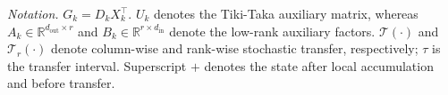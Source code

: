 \documentclass[AMA,LATO2COL]{WileyNJDv5}
\begin{document}
\begin{table}[!t]
{  \vspace{0.25em}
  \begin{minipage}{0.98\textwidth}
  \emph{Notation.}
  \(G_k=D_kX_k^\top\). \(U_k\) denotes the Tiki-Taka auxiliary matrix, whereas
\(A_k\in\mathbb{R}^{d_{\mathrm{out}}\times r}\) and
\(B_k\in\mathbb{R}^{r\times d_{\mathrm{in}}}\) denote the low-rank auxiliary factors.
\(\mathcal{T}(\cdot)\) and \(\mathcal{T}_r(\cdot)\) denote column-wise and rank-wise stochastic transfer, respectively; \(\tau\) is the transfer interval. Superscript \(+\) denotes the state after local accumulation and before transfer.
  \end{minipage}
  }
\end{table}




\end{document}
